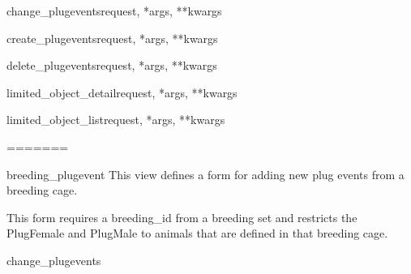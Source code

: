 \documentclass[letterpaper,10pt,english]{sphinxmanual}
\begin{document}
\hypertarget{timed\_mating.urls.change\_plugevents}{}\begin{funcdesc}{change\_plugevents}{request, *args, **kwargs}\end{funcdesc}

\hypertarget{timed\_mating.urls.create\_plugevents}{}\begin{funcdesc}{create\_plugevents}{request, *args, **kwargs}\end{funcdesc}

\hypertarget{timed\_mating.urls.delete\_plugevents}{}\begin{funcdesc}{delete\_plugevents}{request, *args, **kwargs}\end{funcdesc}

\hypertarget{timed\_mating.urls.limited\_object\_detail}{}\begin{funcdesc}{limited\_object\_detail}{request, *args, **kwargs}\end{funcdesc}

\hypertarget{timed\_mating.urls.limited\_object\_list}{}\begin{funcdesc}{limited\_object\_list}{request, *args, **kwargs}\end{funcdesc}
=======

\hypertarget{timed\_mating.views.breeding\_plugevent}{}\begin{memberdesc}{breeding\_plugevent}
This view defines a form for adding new plug events from a breeding cage.

This form requires a breeding\_id from a breeding set and restricts the PlugFemale and PlugMale to animals that are defined in that breeding cage.
\end{memberdesc}
\hypertarget{module-timed\_mating.urls}{}
\modulesynopsis{}

\hypertarget{timed\_mating.urls.change\_plugevents}{}\begin{memberdesc}{change\_plugevents}\end{memberdesc}
\end{document}
